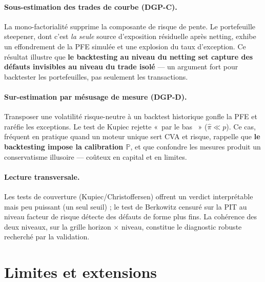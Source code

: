 \documentclass[11pt,a4paper]{article}
\providecommand{\og}{«~}
\providecommand{\fg}{~»}
\newcommand{\Prob}{\mathbb{P}}
\theoremstyle{remark}
\begin{document}
\paragraph{Sous-estimation des trades de courbe (DGP-C).} La mono-factorialité supprime la composante de risque de pente. Le portefeuille steepener, dont c'est \emph{la seule} source d'exposition résiduelle après netting, exhibe un effondrement de la PFE simulée et une explosion du taux d'exception. Ce résultat illustre que \textbf{le backtesting au niveau du netting set capture des défauts invisibles au niveau du trade isolé} --- un argument fort pour backtester les portefeuilles, pas seulement les transactions.

\paragraph{Sur-estimation par mésusage de mesure (DGP-D).} Transposer une volatilité risque-neutre à un backtest historique gonfle la PFE et raréfie les exceptions. Le test de Kupiec rejette \og par le bas \fg{} ($\hat\pi \ll p$). Ce cas, fréquent en pratique quand un moteur unique sert CVA et risque, rappelle que \textbf{le backtesting impose la calibration $\Prob$}, et que confondre les mesures produit un conservatisme illusoire --- coûteux en capital et en limites.

\paragraph{Lecture transversale.} Les tests de couverture (Kupiec/Christoffersen) offrent un verdict interprétable mais peu puissant (un seul seuil) ; le test de Berkowitz censuré sur la PIT au niveau facteur de risque détecte des défauts de forme plus fins. La cohérence des deux niveaux, sur la grille horizon $\times$ niveau, constitue le diagnostic robuste recherché par la validation.

\section{Limites et extensions}
\label{sec:limites}
\end{document}
